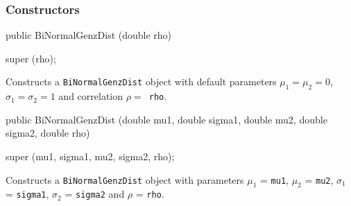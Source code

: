 \subsubsection* {Constructors}

\begin{code}

   public BiNormalGenzDist (double rho) \begin{hide} {
       super (rho);
   }\end{hide}
\end{code}
\begin{tabb}
 Constructs a \texttt{BiNormalGenzDist} object with default  parameters
 $\mu_1 = \mu_2 = 0$, $\sigma_1 = \sigma_2 = 1$ and correlation
 $\rho = $\texttt{ rho}.
  \end{tabb}
\begin{code}

   public BiNormalGenzDist (double mu1, double sigma1,
                            double mu2, double sigma2, double rho) \begin{hide} {
      super (mu1, sigma1, mu2, sigma2, rho);
   }\end{hide}
\end{code}
\begin{tabb}
 Constructs a \texttt{BiNormalGenzDist} object with parameters $\mu_1$ = \texttt{mu1},
 $\mu_2$ = \texttt{mu2}, $\sigma_1$ = \texttt{sigma1},  $\sigma_2$ = \texttt{sigma2}
 and $\rho$ = \texttt{rho}.   
  \end{tabb}

